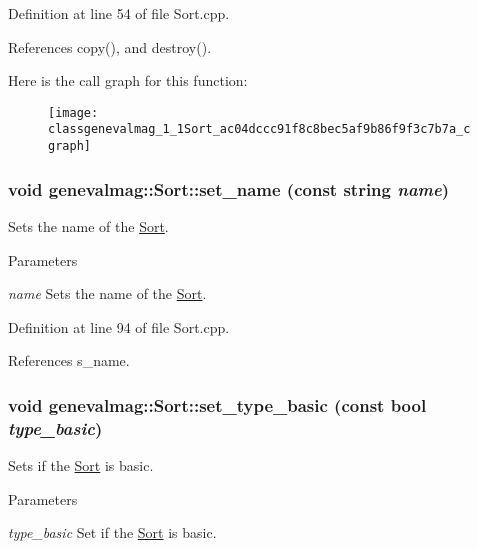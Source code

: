 Definition at line 54 of file Sort.cpp.



References copy(), and destroy().



Here is the call graph for this function:\nopagebreak
\begin{figure}[H]
\begin{center}
\leavevmode
\texttt{[image: classgenevalmag\_1\_1Sort\_ac04dccc91f8c8bec5af9b86f9f3c7b7a\_cgraph]}
\end{center}
\end{figure}


\hypertarget{classgenevalmag_1_1Sort_ab98ad164260650cae11a6a712d1808d5}{
\subsubsection[{set\_\-name}]{\setlength{\rightskip}{0pt plus 5cm}void genevalmag::Sort::set\_\-name (const string {\em name})}}
\label{classgenevalmag_1_1Sort_ab98ad164260650cae11a6a712d1808d5}
Sets the name of the \hyperlink{classgenevalmag_1_1Sort}{Sort}. 
\begin{DoxyParams}{Parameters}
\item[{\em name}]Sets the name of the \hyperlink{classgenevalmag_1_1Sort}{Sort}. \end{DoxyParams}


Definition at line 94 of file Sort.cpp.



References s\_\-name.

\hypertarget{classgenevalmag_1_1Sort_aef4090cc2961e5f9614d1db43386d485}{
\subsubsection[{set\_\-type\_\-basic}]{\setlength{\rightskip}{0pt plus 5cm}void genevalmag::Sort::set\_\-type\_\-basic (const bool {\em type\_\-basic})}}
\label{classgenevalmag_1_1Sort_aef4090cc2961e5f9614d1db43386d485}
Sets if the \hyperlink{classgenevalmag_1_1Sort}{Sort} is basic. 
\begin{DoxyParams}{Parameters}
\item[{\em type\_\-basic}]Set if the \hyperlink{classgenevalmag_1_1Sort}{Sort} is basic. \end{DoxyParams}


